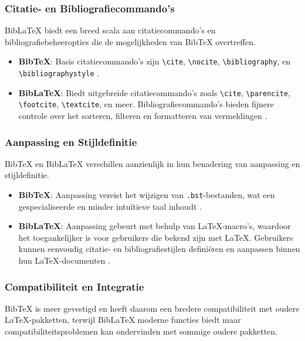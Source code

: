 \subsubsection{Citatie- en Bibliografiecommando's}
BibLaTeX biedt een breed scala aan citatiecommando's en bibliografiebeheeropties die de mogelijkheden van BibTeX overtreffen.

\begin{itemize}
    \item \textbf{BibTeX}: Basis citatiecommando's zijn \texttt{\textbackslash cite}, \texttt{\textbackslash nocite}, \texttt{\textbackslash bibliography}, en \texttt{\textbackslash bibliographystyle} \autocite{Patashnik1988}.
    \item \textbf{BibLaTeX}: Biedt uitgebreide citatiecommando's zoals \texttt{\textbackslash cite}, \texttt{\textbackslash parencite}, \texttt{\textbackslash footcite}, \texttt{\textbackslash textcite}, en meer. Bibliografiecommando's bieden fijnere controle over het sorteren, filteren en formatteren van vermeldingen \autocite{Kime2024}.
\end{itemize}

\subsubsection{Aanpassing en Stijldefinitie}
BibTeX en BibLaTeX verschillen aanzienlijk in hun benadering van aanpassing en stijldefinitie.

\begin{itemize}
    \item \textbf{BibTeX}: Aanpassing vereist het wijzigen van \texttt{.bst}-bestanden, wat een gespecialiseerde en minder intuïtieve taal inhoudt \autocite{Patashnik1988}.
    \item \textbf{BibLaTeX}: Aanpassing gebeurt met behulp van \LaTeX{}-macro's, waardoor het toegankelijker is voor gebruikers die bekend zijn met \LaTeX{}. Gebruikers kunnen eenvoudig citatie- en bibliografiestijlen definiëren en aanpassen binnen hun \LaTeX{}-documenten \autocite{Kime2024}.
\end{itemize}

\subsubsection{Compatibiliteit en Integratie}
BibTeX is meer gevestigd en heeft daarom een bredere compatibiliteit met oudere \LaTeX{}-pakketten, terwijl BibLaTeX moderne functies biedt maar compatibiliteitsproblemen kan ondervinden met sommige oudere pakketten.


